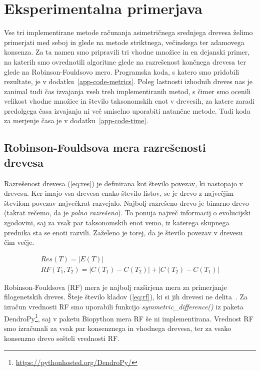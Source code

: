 \documentclass[a4paper, 12pt]{book}
\begin{document}
\chapter{Eksperimentalna primerjava}

Vse tri implementirane metode računanja asimetričnega srednjega drevesa želimo 
primerjati med seboj in glede na metode striktnega, večinskega ter adamovega 
konsenza. Za ta namen smo pripravili tri vhodne množice in en dejanski primer,
na katerih smo ovrednotili algoritme glede na razrešenost končnega drevesa ter 
glede na Robinson-Fouldsovo mero. 
Programska koda, s katero smo pridobili rezultate, je v 
dodatku~\ref{app-code-metrics}. Poleg lastnosti izhodnih dreves nas je zanimal 
tudi čas izvajanja vseh treh implementiranih metod, s čimer smo ocenili velikost 
vhodne množice in število taksonomskih enot v drevesih, za katere zaradi 
predolgega časa izvajanja ni več smiselno uporabiti  natančne metode. Tudi koda za 
merjenje časa je v dodatku~\ref{app-code-time}.

\section[Robinson-Fouldsova mera razrešenosti drevesa]{Robinson-Fouldsova mera razrešenosti\\ drevesa}
Razrešenost drevesa (\ref{eq:res}) je definirana kot število povezav, ki 
nastopajo v drevesu. Ker imajo vsa drevesa enako število listov, se je drevo z 
največjim številom povezav največkrat razvejalo. Najbolj razrešeno drevo je 
binarno drevo (takrat rečemo, da je {\it polno razrešeno}). To ponuja največ 
informacij o evolucijski zgodovini, saj za vsak par taksonomskih enot vemo, 
iz katerega skupnega prednika sta se enoti razvili. Zaželeno je torej, da 
je število povezav v drevesu čim večje.

\begin{align}
	Res(T) = \left|E(T)\right| \label{eq:res} ~~~~~~~~~~~~~~~~~~~~~ \\
	RF(T_1, T_2) = \left|C(T_1) - C(T_2)\right| + \left|C(T_2) - C(T_1)\right|  \label{eq:rf}
\end{align}

\noindent Robinson-Fouldsova (RF) mera je najbolj razširjena mera za primerjanje 
filogenetskih dreves. Šteje število kladov (\ref{eq:rf}), ki si jih drevesi 
ne delita~\cite{rf}. Za izračun vrednosti RF smo uporabili funkcijo 
{\it symmetric\_difference()} iz paketa 
DendroPy\footnote{\url{https://pythonhosted.org/DendroPy/}}, saj v paketu 
Biopython mera RF še ni implementirana. Vrednost RF smo izračunali za 
vsak par konsenznega in vhodnega drevesa, ter za vsako konsenzno drevo sešteli
vrednosti RF.
\end{document}
